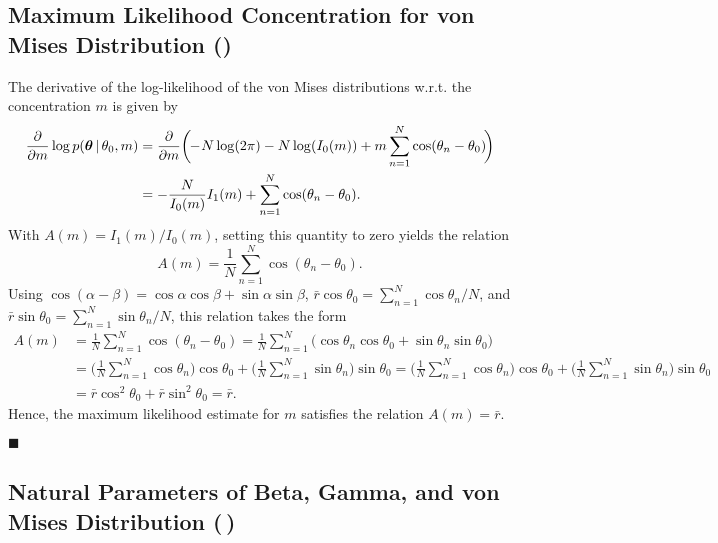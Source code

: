 \documentclass[11pt, a4paper]{scrartcl}
\renewcommand{\vec}[1]{\bm{#1}}
\newcommand{\given}{\,\vert\,}
\newcommand{\eot}{\hfill\(\blacksquare\)}
\newcommand{\diffstar}{\texorpdfstring{\raisebox{-1pt}{\resizebox{!}{8pt}{\(\star\)}}}{*}}
\newcommand{\onestar}  {(\diffstar)}
\newcommand{\twostar}  {(\diffstar\,\diffstar)}
\begin{document}
		\subsection{Maximum Likelihood Concentration for von Mises Distribution  \onestar}
			The derivative of the log-likelihood of the von Mises distributions w.r.t. the concentration \(m\) is given by
			\begin{align}
				\pdv{m} \log p(\vec{\theta} \given \theta_0, m)
					&= \pdv{m} \bigg(\!\! -\!N \log(2\pi) - N \log(I_0(m)) + m \sum_{n = 1}^{N} \cos(\theta_n - \theta_0) \!\bigg) \\
					&= -\frac{N}{I_0(m)} I_1(m) + \sum_{n = 1}^{N} \cos(\theta_n - \theta_0).
			\end{align}
			With \( A(m) = I_1(m)/I_0(m) \), setting this quantity to zero yields the relation
			\begin{equation}
				A(m) = \frac{1}{N} \sum_{n = 1}^{N} \cos(\theta_n - \theta_0).
			\end{equation}
			Using \( \cos(\alpha - \beta) = \cos\alpha \cos\beta + \sin\alpha \sin\beta \), \( \bar{r} \cos\theta_0 = \sum_{n = 1}^{N} \cos\theta_n / N \), and \( \bar{r} \sin\theta_0 = \sum_{n = 1}^{N} \sin\theta_n / N \), this relation takes the form
			\begin{align}
				A(m)
					&= \frac{1}{N} \sum_{n = 1}^{N} \cos(\theta_n - \theta_0)
					 = \frac{1}{N} \sum_{n = 1}^{N} \big(\! \cos\theta_n \cos\theta_0 + \sin\theta_n \sin\theta_0 \big) \\
					&= \bigg( \frac{1}{N} \sum_{n = 1}^{N} \cos\theta_n \!\bigg) \cos\theta_0 + \bigg( \frac{1}{N} \sum_{n = 1}^{N} \sin\theta_n \!\bigg) \sin\theta_0
					 = \bigg( \frac{1}{N} \sum_{n = 1}^{N} \cos\theta_n \!\bigg) \cos\theta_0 + \bigg( \frac{1}{N} \sum_{n = 1}^{N} \sin\theta_n \!\bigg) \sin\theta_0 \\
					&= \bar{r} \cos^2\theta_0 + \bar{r} \sin^2\theta_0
					 = \bar{r}.
			\end{align}
			Hence, the maximum likelihood estimate for \(m\) satisfies the relation \( A(m) = \bar{r} \).

			\eot

		\subsection{Natural Parameters of Beta, Gamma, and von Mises Distribution  \twostar}
\end{document}

